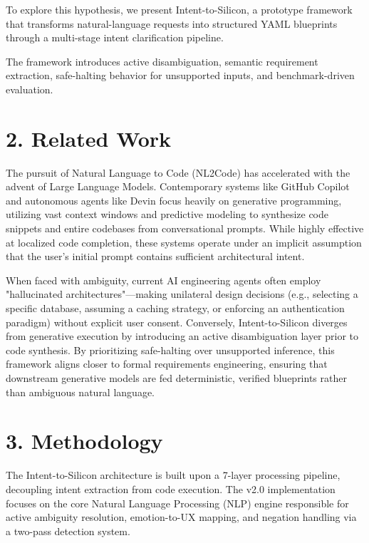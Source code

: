 \documentclass[11pt,a4paper]{article}
\begin{document}
To explore this hypothesis, we present Intent-to-Silicon, a prototype framework that transforms natural-language requests into structured YAML blueprints through a multi-stage intent clarification pipeline.

The framework introduces active disambiguation, semantic requirement extraction, safe-halting behavior for unsupported inputs, and benchmark-driven evaluation.



\section{2. Related Work}

The pursuit of Natural Language to Code (NL2Code) has accelerated with the advent of Large Language Models. Contemporary systems like GitHub Copilot and autonomous agents like Devin focus heavily on generative programming, utilizing vast context windows and predictive modeling to synthesize code snippets and entire codebases from conversational prompts. While highly effective at localized code completion, these systems operate under an implicit assumption that the user's initial prompt contains sufficient architectural intent. 

When faced with ambiguity, current AI engineering agents often employ "hallucinated architectures"—making unilateral design decisions (e.g., selecting a specific database, assuming a caching strategy, or enforcing an authentication paradigm) without explicit user consent. Conversely, Intent-to-Silicon diverges from generative execution by introducing an active disambiguation layer prior to code synthesis. By prioritizing safe-halting over unsupported inference, this framework aligns closer to formal requirements engineering, ensuring that downstream generative models are fed deterministic, verified blueprints rather than ambiguous natural language.



\section{3. Methodology}

The Intent-to-Silicon architecture is built upon a 7-layer processing pipeline, decoupling intent extraction from code execution. The v2.0 implementation focuses on the core Natural Language Processing (NLP) engine responsible for active ambiguity resolution, emotion-to-UX mapping, and negation handling via a two-pass detection system.
\end{document}
